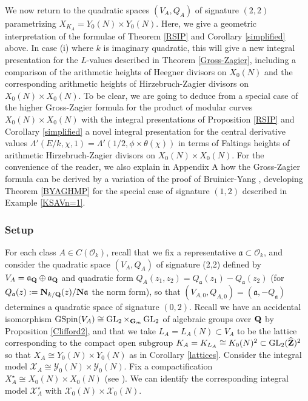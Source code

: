 \documentclass{amsart}
\theoremstyle{definition}
\theoremstyle{definition}
\theoremstyle{definition}
\begin{document}
We now return to the quadratic spaces $(V_A, Q_A)$ of signature $(2,2)$ parametrizing $X_{K_A} = Y_0(N) \times Y_0(N)$.
Here, we give a geometric interpretation of the formulae of Theorem \ref{RSIP} and Corollary \ref{simplified} above.
In case (i) where $k$ is imaginary quadratic, this will give a new integral presentation for the $L$-values described in 
Theorem \ref{Gross-Zagier}, including a comparison of the arithmetic heights of Heegner divisors on $X_0(N)$ and the corresponding arithmetic heights 
of Hirzebruch-Zagier divisors on $X_0(N) \times X_0(N)$. To be clear, we are going to deduce from a special case of the higher Gross-Zagier formula for the product of modular curves
$X_0(N) \times X_0(N)$ with the integral presentations of Proposition \ref{RSIP} and Corollary \ref{simplified} a novel integral presentation for the central derivative values 
$\Lambda'(E/k, \chi, 1) = \Lambda'(1/2, \phi \times \theta(\chi))$ in terms of Faltings heights of arithmetic Hirzebruch-Zagier divisors on $X_0(N) \times X_0(N)$.
For the convenience of the reader, we also explain in Appendix A how the Gross-Zagier formula \cite[Theorem I (6.3)]{GZ} can be derived by a variation of the proof of 
Bruinier-Yang \cite[Theorem 7.7]{BY}, developing Theorem \ref{BYAGHMP} for the special case of signature $(1,2)$ described in Example \ref{KSAVn=1}. 

\subsubsection{Setup}

For each class $A \in C(\mathcal{O}_k)$, recall that we fix a representative $\mathfrak{a} \subset \mathcal{O}_k$, 
and consider the quadratic space $(V_A, Q_A)$ of signature (2,2) defined by  
$V_A = \mathfrak{a}_{\bf{Q}} \oplus \mathfrak{a}_{\bf{Q}}$ and quadratic form $Q_A(z_1, z_2) = Q_{\mathfrak{a}}(z_1) - Q_{\mathfrak{a}}(z_2)$
(for $Q_{\mathfrak{a}}(z) := {\bf{N}}_{k/{\bf{Q}}}(z)/ {\bf{N}} \mathfrak{a}$ the norm form),
so that $(V_{A,0}, Q_{A,0}) = (\mathfrak{a}, -Q_{\mathfrak{a}})$ determines a quadratic space of signature $(0,2)$. 
Recall we have an accidental isomorphism $\operatorname{GSpin}(V_A) \cong  \operatorname{GL}_2 \times_{{\bf{G}}_m} \operatorname{GL}_2$ of algebraic 
groups over ${\bf{Q}}$ by Proposition \ref{Clifford2}, and that we take $L_A =L_A(N) \subset V_A$ to be the lattice  
corresponding to the compact open subgroup $K_A = K_{L_A} \cong K_0(N)^2 \subset \operatorname{GL}_2(\widehat{\bf{Z}})^2$ 
so that $X_A \cong Y_0(N) \times Y_0(N)$ as in Corollary \ref{lattices}. 
Consider the integral model $\mathcal{X}_A \cong \mathcal{Y}_0(N) \times \mathcal{Y}_0(N)$.
Fix a compactification $X_A^{\star} \cong X_0(N) \times X_0(N)$ (see \cite[$\S$1.2 and 2.4]{Br-123}).
We can identify the corresponding integral model $\mathcal{X}_A^{\star}$ with $\mathcal{X}_0(N) \times \mathcal{X}_0(N)$. 
\end{document}
